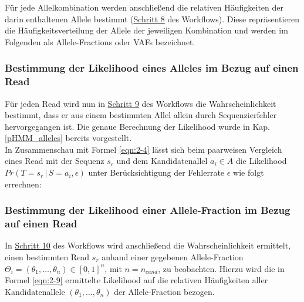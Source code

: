 Für jede Allelkombination werden anschließend die relativen Häufigkeiten der darin enthaltenen Allele bestimmt (\hyperref[step8]{Schritt 8\label{step8txt}} des Workflows). Diese repräsentieren die Häufigkeitsverteilung der Allele der jeweiligen Kombination und werden im Folgenden als Allele-Fractions oder VAFs bezeichnet.\\

\subsubsection{Bestimmung der Likelihood eines Alleles im Bezug auf einen Read} \label{sol_al_read}

Für jeden Read wird nun in \hyperref[step9]{Schritt 9} des Workflows die Wahrscheinlichkeit bestimmt, dass er aus einem bestimmten Allel allein durch Sequenzierfehler hervorgegangen ist. Die genaue Berechnung der Likelihood wurde in Kap. \ref{pHMM_alleles} bereits vorgestellt. \\

In Zusammenschau mit Formel \eqref{eqn:2-4} lässt sich beim paarweisen Vergleich eines Read mit der Sequenz $s_{r}$ und dem Kandidatenallel $a_{i} \in A $ die Likelihood $ Pr(T=s_{r} \, | \, S=a_{i}, \epsilon) $ unter Berücksichtigung der Fehlerrate $\epsilon$ wie folgt errechnen:
\vspace{-0.5cm}
\begin{center}
\end{center}

\subsubsection{Bestimmung der Likelihood einer Allele-Fraction im Bezug auf einen Read} \label{sol_vaf_one_reads}

In \hyperref[step10]{Schritt 10\label{step10txt}} des Workflows wird anschließend die Wahrscheinlichkeit ermittelt, einen bestimmten Read $s_{r}$ anhand einer gegebenen Allele-Fraction $\Theta_{i} = (\theta_{1},\dots,\theta_{n}) \in [0,1]^{n}$, mit $n=n_{cand}$, zu beobachten. Hierzu wird die in Formel \eqref{eqn:2-9} ermittelte Likelihood auf die relativen Häufigkeiten aller Kandidatenallele $ (\theta_{1},\dots,\theta_{n}) $ der Allele-Fraction bezogen.\\

